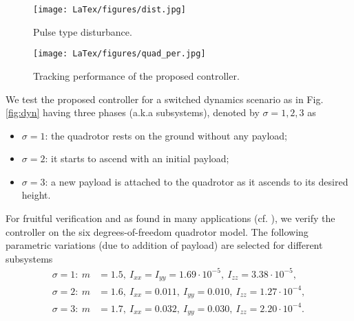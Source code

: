 \begin{figure}[!t]
	\centering
	\texttt{[image: LaTex/figures/dist.jpg]}%
	\caption{{Pulse type disturbance.}}\label{fig:dist} %
\end{figure}

\begin{figure}[!t]
	\centering
	\texttt{[image: LaTex/figures/quad\_per.jpg]}%
	\caption{{Tracking performance of the proposed controller.}}\label{fig:2} %
\end{figure}
We test the proposed controller for a switched dynamics scenario as in Fig. \ref{fig:dyn} having three phases (a.k.a subsystems), denoted by $\sigma=1,2,3$ as
\begin{itemize}
\item $\sigma=1$: the quadrotor rests on the ground without any payload;

\item $\sigma=2$: it starts to ascend with an initial payload;

\item $\sigma=3$: a new payload is attached to the quadrotor as it ascends to its desired height.
\end{itemize}



For fruitful verification and as found in many applications (cf. \cite{ye2019observer,roy2018analysis}), we verify the controller on the six degrees-of-freedom quadrotor model. %
The following parametric variations (due to addition of payload) are selected for different subsystems
\begin{align*}
\sigma=1: ~m & =1.5,~I_{xx}=I_{yy}=1.69\cdot10^{-5},~ I_{zz}=3.38\cdot10^{-5},\\
\sigma=2: ~m & =1.6,~I_{xx}=0.011,~ I_{yy}=0.010,~ I_{zz}=1.27\cdot10^{-4},\\
\sigma=3: ~m& =1.7,~I_{xx}=0.032,~ I_{yy}=0.030,~ I_{zz}=2.20\cdot{10}^{-4}.
\end{align*}

